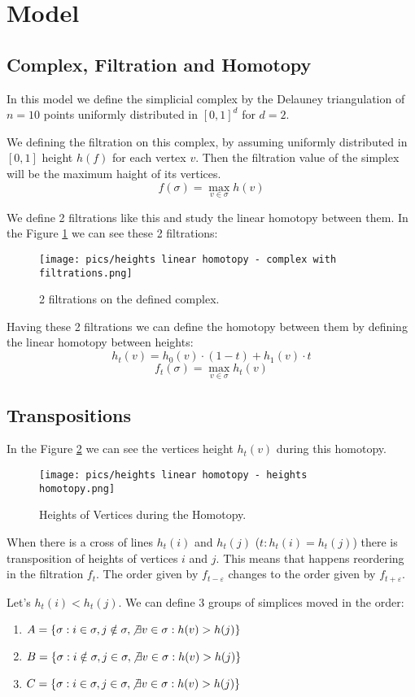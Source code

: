 \documentclass{article}
\begin{document}
\section{Model}
\subsection{Complex, Filtration and Homotopy}
\par In this model we define the simplicial complex by the Delauney triangulation of $n = 10$ points uniformly distributed in $[0, 1]^d$ for $d = 2$.
\par We defining the filtration on this complex, by assuming uniformly distributed in $[0, 1]$ height $h(f)$ for each vertex $v$. Then the filtration value of the simplex will be the maximum haight of its vertices.
$$
    f(\sigma) = \max_{v\in \sigma} h(v)
$$
\par We define 2 filtrations like this and study the linear homotopy between them. In the Figure \ref{fig:complex} we can see these 2 filtrations:
\begin{figure}[h!]
    \centering
    \texttt{[image: pics/heights linear homotopy - complex with filtrations.png]}
    \caption{2 filtrations on the defined complex.}
    \label{fig:complex}
\end{figure}

\par Having these 2 filtrations we can define the homotopy between them by defining the linear homotopy between heights:
$$
    h_t(v) = h_0(v)\cdot(1 - t) + h_1(v)\cdot t
$$
$$
    f_t(\sigma) = \max_{v\in \sigma} h_t(v)
$$

\subsection{Transpositions}
\par In the Figure \ref{fig:homotopy} we can see the vertices height $h_t(v)$ during this homotopy. 
\begin{figure}[h!]
    \centering
    \texttt{[image: pics/heights linear homotopy - heights homotopy.png]}
    \caption{Heights of Vertices during the Homotopy.}
    \label{fig:homotopy}
\end{figure}
\par When there is a cross of lines $h_t(i)$ and $h_t(j)$ ($t: h_t(i) = h_t(j)$) there is transposition of heights of vertices $i$ and $j$. This means that happens reordering in the filtration $f_t$. The order given by $f_{t - \varepsilon}$ changes to the order given by $f_{t + \varepsilon}$.
\par Let's $h_t(i) < h_t(j)$. We can define 3 groups of simplices moved in the order:
\begin{enumerate}
    \item $A = \{\sigma: i \in \sigma, j\notin \sigma, \not\exists v\in \sigma: h(v) > h(j)\}$
    \item $B = \{\sigma: i \notin \sigma, j\in \sigma, \not\exists v\in \sigma: h(v) > h(j)\}$
    \item $C = \{\sigma: i \in \sigma, j\in \sigma, \not\exists v\in \sigma: h(v) > h(j)\}$
\end{enumerate}
\end{document}
